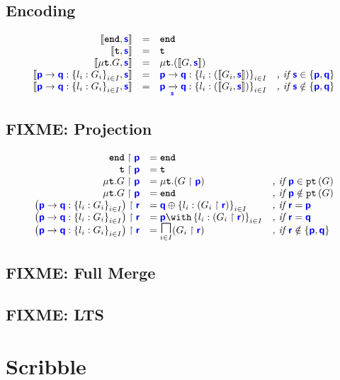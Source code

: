 \documentclass{article}
\begin{document}
\subsection{Encoding}
\doublespacing
\[
\begin{array}{rcll}
		\tyencode{\tyend}{s} & = & \tyend & \\
		\tyencode{\tyrecvar}{s} & = & \tyrecvar & \\
		\tyencode{\tyrec{G}}{s} & = & \tyrec{\left(\tyencode{G}{s}\right)} & \\
		\tyencode{\gcomm{p}{q}{l_i: G_i}{i \in I}}{s} & = & \gcomm{p}{q}{l_i: \left(\tyencode{G_i}{s}\right)}{i \in I} & \textit{, if $\role{s} \in \left\{\role{p}, \role{q}\right\}$} \\
		\tyencode{\gcomm{p}{q}{l_i: G_i}{i \in I}}{s} & = & \gcommroute{p}{q}{s}{l_i: \left(\tyencode{G_i}{s}\right)}{i \in I} & \textit{, if $\role{s} \notin \left\{\role{p}, \role{q}\right\}$} \\
\end{array}
\]
\singlespacing

\subsection{FIXME: Projection}
\doublespacing
\[
\begin{array}{>{\displaystyle}r>{\displaystyle}l>{\displaystyle}l}
		\proj{\tyend}{p} & = \tyend & \\
		\proj{\tyrecvar}{p} & = \tyrecvar & \\
		\proj{\tyrec{G}}{p} & = \tyrec{(\proj{G}{p})} & \textit{, if }\role{p} \in \pt{G}\\
		\proj{\tyrec{G}}{p} & = \tyend & \textit{, if }\role{p} \notin \pt{G}\\
		\proj{\left(\gcomm{p}{q}{l_i: G_i}{i \in I}\right)}{r} & = \tysel{q}{l_i: (\proj{G_i}{r})}{i \in I} & \textit{, if }\role{r} = \role{p} \\
		\proj{\left(\gcomm{p}{q}{l_i: G_i}{i \in I}\right)}{r} & = \tybra{p}{l_i: (\proj{G_i}{r})}{i \in I} & \textit{, if }\role{r} = \role{q} \\
		\proj{\left(\gcomm{p}{q}{l_i: G_i}{i \in I}\right)}{r} & = \underset{i \in I}{\tyMERGEOP}{(\proj{G_i}{r})} & \textit{, if }\role{r} \notin \left\{\role{p},\role{q}\right\}
\end{array}
\]
\singlespacing

\subsection{FIXME: Full Merge}

\subsection{FIXME: LTS}

\section{Scribble}
\end{document}
